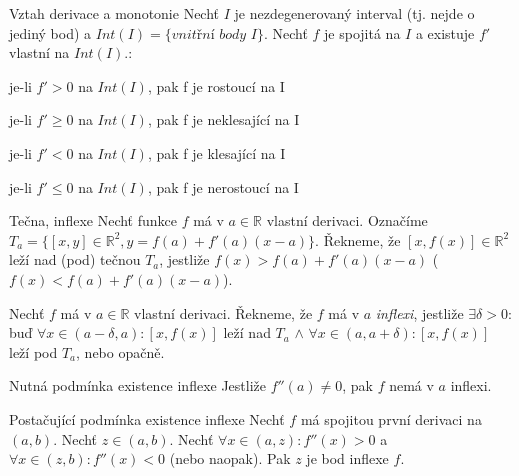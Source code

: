\begin{vetaN}{Vztah derivace a monotonie}
Nechť $I$ je nezdegenerovaný interval (tj. nejde o jediný bod) a $Int(I)=\{\textit{vnitřní body I}\}$. Nechť $f$ je spojitá na $I$ a existuje $f'$ vlastní na $Int(I)$.:
\begin{penumerate}
	\item je-li $f' > 0$ na $Int(I)$, pak f je rostoucí na I
	\item je-li $f' \ge 0$ na $Int(I)$, pak f je neklesající na I
	\item je-li $f' < 0$ na $Int(I)$, pak f je klesající na I
	\item je-li $f' \le 0$ na $Int(I)$, pak f je nerostoucí na I
\end{penumerate}
\end{vetaN}

\begin{definiceN}{Tečna, inflexe}
Nechť funkce $f$ má v $a \in \mathbb{R}$ vlastní derivaci. Označíme $T_a=\{[x,y]\in \mathbb{R}^2, y=f(a)+f'(a)(x-a)\}$. Řekneme, že $[x, f(x)] \in \mathbb{R}^2$ leží nad (pod) tečnou $T_a$, jestliže $f(x)>f(a)+f'(a)(x-a)$ ($f(x)<f(a)+f'(a)(x-a)$).

Nechť $f$ má v $a \in \mathbb{R}$ vlastní derivaci. Řekneme, že $f$ má v $a$ \emph{inflexi}, jestliže $\exists \delta > 0$: buď $\forall x \in (a-\delta, a): [x, f(x)]$ leží nad $T_a$ $\wedge$ $\forall x \in (a, a+\delta): [x, f(x)]$ leží pod $T_a$, nebo opačně.
\end{definiceN}

\begin{vetaN}{Nutná podmínka existence inflexe}
Jestliže $f''(a) \neq 0$, pak $f$ nemá v $a$ inflexi.
\end{vetaN}

\begin{vetaN}{Postačující podmínka existence inflexe}
Nechť $f$ má spojitou první derivaci na $(a,b)$. Nechť $z \in (a,b)$. Nechť $\forall x \in (a,z): f''(x)>0$ a $\forall x \in (z, b): f''(x)<0$ (nebo naopak). Pak $z$ je bod inflexe $f$.
\end{vetaN}

